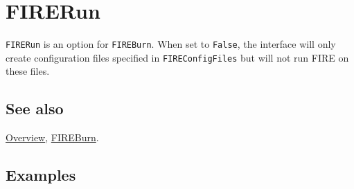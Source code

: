 \documentclass[../FeynHelpersManual.tex]{subfiles}
\begin{document}
\hypertarget{firerun}{
\section{FIRERun}\label{firerun}}

\texttt{FIRERun} is an option for \texttt{FIREBurn}. When set to
\texttt{False}, the interface will only create configuration files
specified in \texttt{FIREConfigFiles} but will not run FIRE on these
files.

\subsection{See also}

\hyperlink{toc}{Overview}, \hyperlink{fireburn}{FIREBurn}.

\subsection{Examples}
\end{document}
